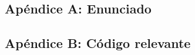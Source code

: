 \documentclass{article}
\begin{document}
\subsection{Apéndice A: Enunciado}


\subsection{Apéndice B: Código relevante}







\end{document}

